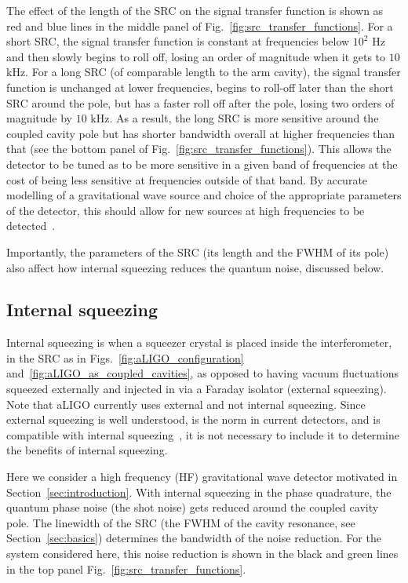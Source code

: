 \documentclass[aps,pra,superscriptaddress,reprint,nofootinbib]{revtex4-1}
\begin{document}
The effect of the length of the SRC on the signal transfer function is shown as red and blue lines in the middle panel of Fig.~\ref{fig:src_transfer_functions}.
For a short SRC, the signal transfer function is constant at frequencies below $10^2$ Hz and then slowly begins to roll off, losing an order of magnitude when it gets to $10$ kHz. For a long SRC (of comparable length to the arm cavity), the signal transfer function is unchanged at lower frequencies, begins to roll-off later than the short SRC around the pole, but has a faster roll off after the pole, losing two orders of magnitude by $10$ kHz. As a result, the long SRC is more sensitive around the coupled cavity pole but has shorter bandwidth overall at higher frequencies than that (see the bottom panel of Fig.~\ref{fig:src_transfer_functions}). This allows the detector to be tuned as to be more sensitive in a given band of frequencies at the cost of being less sensitive at frequencies outside of that band. By accurate modelling of a gravitational wave source and choice of the appropriate parameters of the detector, this should allow for new sources at high frequencies to be detected~\cite{Adya_2020}.


Importantly, the parameters of the SRC (its length and the FWHM of its pole) also affect how internal squeezing reduces the quantum noise, discussed below.

\subsection{Internal squeezing}
\label{sec:internal_squeezing}

Internal squeezing is when a squeezer crystal is placed inside the interferometer, in the SRC as in Figs.~\ref{fig:aLIGO_configuration} and~\ref{fig:aLIGO_as_coupled_cavities}, as opposed to having vacuum fluctuations squeezed externally and injected in via a Faraday isolator (external squeezing). Note that aLIGO currently uses external and not internal squeezing. Since external squeezing is well understood, is the norm in current detectors, and is compatible with internal squeezing~\cite{Adya_2020,Korobko_2019}, it is not necessary to include it to determine the benefits of internal squeezing.


Here we consider a high frequency (HF) gravitational wave detector motivated in Section~\ref{sec:introduction}. With internal squeezing in the phase quadrature, the quantum phase noise (the shot noise) gets reduced around the coupled cavity pole. The linewidth of the SRC (the FWHM of the cavity resonance, see Section~\ref{sec:basics}) determines the bandwidth of the noise reduction. For the system considered here, this noise reduction is shown in the black and green lines in the top panel Fig.~\ref{fig:src_transfer_functions}.
\end{document}
